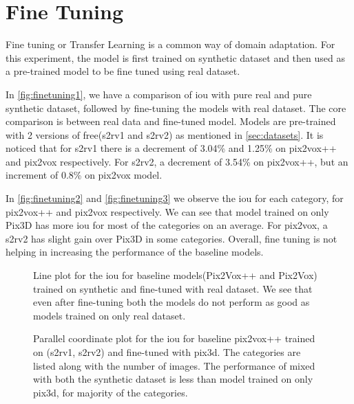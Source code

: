 \section{Fine Tuning}\label{sec:fine-tuning}
Fine tuning or Transfer Learning is a common way of domain adaptation.
For this experiment, the model is first trained on synthetic dataset and then used as a pre-trained model to be fine tuned using real dataset.

In \autoref{fig:finetuning1}, we have a comparison of \gls{iou}  with pure real and pure synthetic dataset, followed by fine-tuning the models with real dataset.
The core comparison is between real data and fine-tuned model.
Models are pre-trained with 2 versions of \gls{free}(\gls{s2rv1} and \gls{s2rv2}) as mentioned in \autoref{sec:datasets}.
It is noticed that for \gls{s2rv1} there is a decrement of 3.04\% and 1.25\% on pix2vox++ and pix2vox respectively.
For \gls{s2rv2}, a decrement of 3.54\% on pix2vox++, but an increment of 0.8\% on pix2vox model.

In \autoref{fig:finetuning2} and \autoref{fig:finetuning3} we observe the \gls{iou} for each category, for pix2vox++ and pix2vox respectively.
We can see that model trained on only Pix3D has more \gls{iou} for most of the categories on an average.
For pix2vox, a \gls{s2rv2} has slight gain over Pix3D in some categories.
Overall, fine tuning is not helping in increasing the performance of the baseline models.

\begin{figure}
    \centering
    \resizebox{0.75\textwidth}{!}{}
    \caption{Line plot for the \gls{iou} for baseline models(Pix2Vox++ and Pix2Vox) trained on synthetic and fine-tuned with real dataset.
    We see that even after fine-tuning both the models do not perform as good as models trained on only real dataset.}
    \label{fig:finetuning1}
\end{figure}


\begin{figure}
    \centering
    \resizebox{0.75\textwidth}{!}{}
    \caption{Parallel coordinate plot for the \gls{iou} for baseline pix2vox++ trained on (\gls{s2rv1}, \gls{s2rv2}) and fine-tuned with pix3d.
    The categories are listed along with the number of images.
    The performance of  mixed with both the synthetic dataset is less than model trained on only pix3d, for majority of the categories.}
    \label{fig:finetuning2}
\end{figure}

